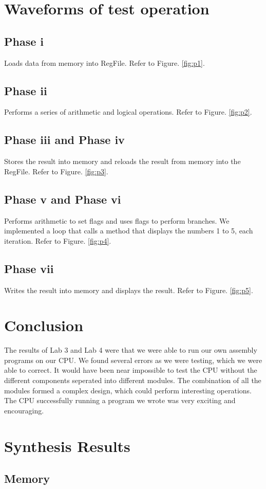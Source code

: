 \documentclass[11pt]{article}
\begin{document}
\section{ Waveforms of test operation }
\subsection{Phase i}
Loads data from memory into RegFile. Refer to Figure. \ref{fig:p1}. 

\subsection{Phase ii}
Performs a series of arithmetic and logical operations. Refer to Figure. \ref{fig:p2}. 

\subsection{Phase iii and Phase iv}
Stores the result into memory and reloads the result from memory into the RegFile.  Refer to Figure. \ref{fig:p3}. 

\subsection{Phase v and Phase vi}
Performs arithmetic to set flags and uses flags to perform branches. We implemented a loop that calls a method that displays the numbers 1 to 5, each iteration. Refer to Figure. \ref{fig:p4}. 

\subsection{Phase vii}
Writes the result into memory and displays the result. Refer to Figure. \ref{fig:p5}. 


\section{Conclusion}
The results of Lab 3 and Lab 4 were that we were able to run our own assembly programs on our CPU. We found several errors as we were testing, which we were able to correct. It would have been near impossible to test the CPU without the different components seperated into different modules. The combination of all the modules formed a complex design, which could perform interesting operations. The CPU successfully running a program we wrote was very exciting and encouraging. 


\newpage
\appendixname
\appendix
\section{Synthesis Results}
\subsection{Memory}
\end{document}
